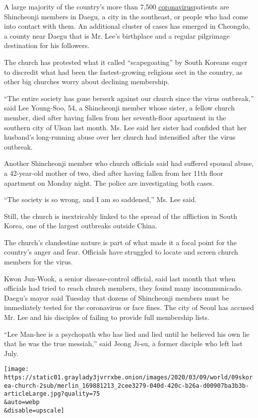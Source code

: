 A large majority of the country's more than 7,500
\href{http://www.nytimes3xbfgragh.onion/2020/03/10/world/coronavirus-news.html}{coronavirus}patients
are Shincheonji members in Daegu, a city in the southeast, or people who
had come into contact with them. An additional cluster of cases has
emerged in Cheongdo, a county near Daegu that is Mr. Lee's birthplace
and a regular pilgrimage destination for his followers.

The church has protested what it called ``scapegoating'' by South
Koreans eager to discredit what had been the fastest-growing religious
sect in the country, as other big churches worry about declining
membership.

``The entire society has gone berserk against our church since the virus
outbreak,'' said Lee Young-Soo, 54, a Shincheonji member whose sister, a
fellow church member, died after having fallen from her seventh-floor
apartment in the southern city of Ulsan last month. Ms. Lee said her
sister had confided that her husband's long-running abuse over her
church had intensified after the virus outbreak.

Another Shincheonji member who church officials said had suffered
spousal abuse, a 42-year-old mother of two, died after having fallen
from her 11th floor apartment on Monday night. The police are
investigating both cases.

``The society is so wrong, and I am so saddened,'' Ms. Lee said.

Still, the church is inextricably linked to the spread of the affliction
in South Korea, one of the largest outbreaks outside China.

The church's clandestine nature is part of what made it a focal point
for the country's anger and fear. Officials have struggled to locate and
screen church members for the virus.

Kwon Jun-Wook, a senior disease-control official, said last month that
when officials had tried to reach church members, they found many
incommunicado. Daegu's mayor said Tuesday that dozens of Shincheonji
members must be immediately tested for the coronavirus or face fines.
The city of Seoul has accused Mr. Lee and his disciples of failing to
provide full membership lists.

``Lee Man-hee is a psychopath who has lied and lied until he believed
his own lie that he was the true messiah,'' said Jeong Ji-su, a former
disciple who left last July.

\texttt{[image: https://static01.graylady3jvrrxbe.onion/images/2020/03/09/world/09skorea-church-2sub/merlin\_169881213\_2cee3279-040d-420c-b26a-d00907ba3b3b-articleLarge.jpg?quality=75\\\&auto=webp\\\&disable=upscale]}

